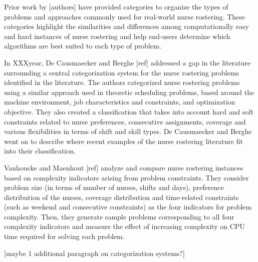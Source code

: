 Prior work by [authors] have   %
provided categories to organize the types of problems and approaches
commonly used for real-world nurse rostering.
These categories highlight the similarities  %
and differences
among computationally easy and hard instances of nurse rostering and 
help end-users determine
which algorithms
are best suited to each type of problem.

In XXXyear, De Causmaecker and Berghe [ref] addressed a gap in the literature 
surrounding a central categorization system for the nurse rostering problems identified in the literature.
The authors categorized
nurse rostering problems using a similar approach used in theoretic scheduling problems,
based around the machine environment, job characteristics and constraints,
and optimization objective. They also created a classification that takes into account
hard and soft constraints related to nurse preferences, consecutive 
assignments, coverage and various flexibilities in terms of shift and
skill types. De Causmaecker and Berghe went on to describe where recent examples of the nurse rostering
literature fit into their classification. %

Vanhoucke and Maenhout [ref] analyze and compare nurse rostering instances
based on complexity indicators arising from problem constraints. They consider
problem size (in terms of number of nurses, shifts and days), preference distribution
of the nurses, coverage distribution and time-related constraints (such as weekend
and consecutive constraints) as the four indicators for problem complexity.
Then, they generate sample problems corresponding to all four complexity indicators
and measure the effect of increasing complexity on CPU time required for solving each
problem. 

[maybe 1 additional paragraph on categorization systems?] %


